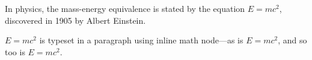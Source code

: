 \documentclass[12pt, letterpaper]{article}
\begin{document}
	In physics, the mass-energy equivalence is stated by the equation $E=mc^2$, discovered in 1905 by Albert Einstein.
	
	\begin{math}
		E=mc^2
	\end{math} is typeset in a paragraph using inline math node---as is $E=mc^2$, and so too is \(E=mc^2\).
\end{document}
